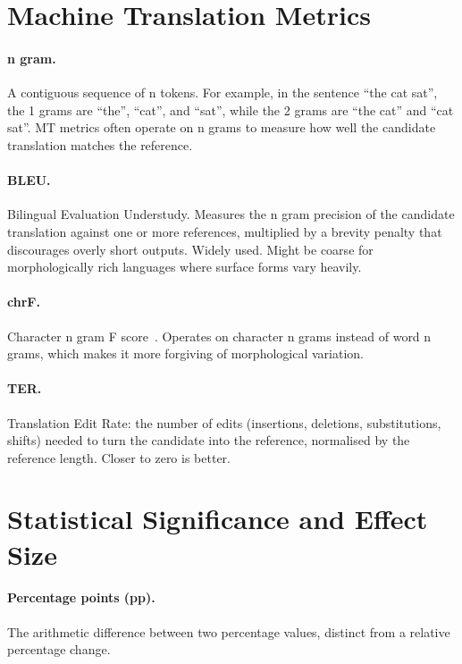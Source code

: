 \section{Machine Translation Metrics}
\label{sec:appendix-mt-metrics}

\paragraph{n gram.} A contiguous sequence of n tokens. For example, in the sentence ``the cat sat'', the 1 grams are ``the'', ``cat'', and ``sat'', while the 2 grams are ``the cat'' and ``cat sat''. MT metrics often operate on n grams to measure how well the candidate translation matches the reference.

\paragraph{BLEU.} Bilingual Evaluation Understudy. Measures the n gram precision of the candidate translation against one or more references, multiplied by a brevity penalty that discourages overly short outputs. Widely used. Might be coarse for morphologically rich languages where surface forms vary heavily.

\paragraph{chrF.} Character n gram F score~\cite{popovic2015chrf}. Operates on character n grams instead of word n grams, which makes it more forgiving of morphological variation.

\paragraph{TER.} Translation Edit Rate: the number of edits (insertions, deletions, substitutions, shifts) needed to turn the candidate into the reference, normalised by the reference length. Closer to zero is better.

\section{Statistical Significance and Effect Size}
\label{sec:appendix-statistics}


\paragraph{Percentage points (pp).} The arithmetic difference between two percentage values, distinct from a relative percentage change.

